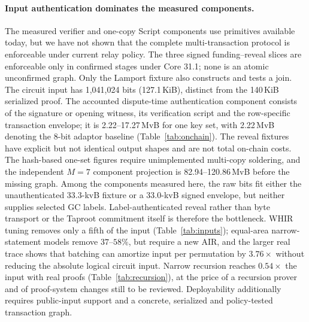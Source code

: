 \documentclass[11pt]{article}
\begin{document}
\paragraph{Input authentication dominates the measured components.} The measured verifier and one-copy Script
components use primitives available today, but we have not shown that the
complete multi-transaction protocol is enforceable under current relay policy.
The three signed funding--reveal slices are enforceable only in confirmed
stages under Core 31.1; none is an atomic unconfirmed graph. Only the Lamport
fixture also constructs and tests a join.
The circuit input has 1{,}041{,}024 bits (127.1\,KiB), distinct from the 140\,KiB
serialized proof. The accounted dispute-time authentication component consists
of the signature or opening witness, its verification script and the
row-specific transaction envelope; it is 2.22--17.27\,MvB for one key set,
with 2.22\,MvB denoting the 8-bit adaptor baseline
(Table~\ref{tab:onchain}). The reveal fixtures have explicit but not identical
output shapes and are not total on-chain costs. The hash-based
one-set figures require unimplemented multi-copy soldering, and the independent
$M=7$ component projection is 82.94--120.86\,MvB before the missing graph. Among
the components measured here, the raw bits fit either the unauthenticated
33.3-kvB fixture or a 33.0-kvB signed envelope, but neither supplies selected
GC labels. Label-authenticated reveal rather than byte transport or the Taproot
commitment itself is therefore the bottleneck.
WHIR tuning removes only a fifth of the input (Table~\ref{tab:inputs}); equal-area
narrow-statement models remove $37$--$58\%$, but require a new AIR, and the
larger real trace shows that batching can amortize input per permutation by
$3.76\times$ without reducing the absolute logical circuit input. Narrow
recursion reaches $0.54\times$ the input with real proofs
(Table~\ref{tab:recursion}), at the price of a recursion prover and of
proof-system changes still to be reviewed.
Deployability additionally requires public-input support and a concrete,
serialized and policy-tested transaction graph.
\end{document}
